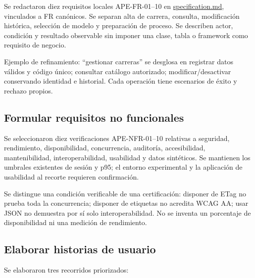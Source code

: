 \documentclass[11pt,a4paper]{article}
\begin{document}
Se redactaron diez requisitos locales APE-FR-01--10 en
\url{specification.md}, vinculados a FR canónicos. Se separan alta de
carrera, consulta, modificación histórica, selección de modelo y
preparación de proceso. Se describen actor, condición y resultado
observable sin imponer una clase, tabla o framework como requisito de
negocio.

Ejemplo de refinamiento: ``gestionar carreras'' se desglosa en registrar
datos válidos y código único; consultar catálogo autorizado;
modificar/desactivar conservando identidad e historial. Cada operación
tiene escenarios de éxito y rechazo propios.

\subsection{Formular requisitos no
funcionales}\label{formular-requisitos-no-funcionales}

Se seleccionaron diez verificaciones APE-NFR-01--10 relativas a
seguridad, rendimiento, disponibilidad, concurrencia, auditoría,
accesibilidad, mantenibilidad, interoperabilidad, usabilidad y datos
sintéticos. Se mantienen los umbrales existentes de sesión y p95; el
entorno experimental y la aplicación de usabilidad al recorte requieren
confirmación.

Se distingue una condición verificable de una certificación: disponer de
ETag no prueba toda la concurrencia; disponer de etiquetas no acredita
WCAG AA; usar JSON no demuestra por sí solo interoperabilidad. No se
inventa un porcentaje de disponibilidad ni una medición de rendimiento.

\subsection{Elaborar historias de
usuario}\label{elaborar-historias-de-usuario}

Se elaboraron tres recorridos priorizados:
\end{document}
